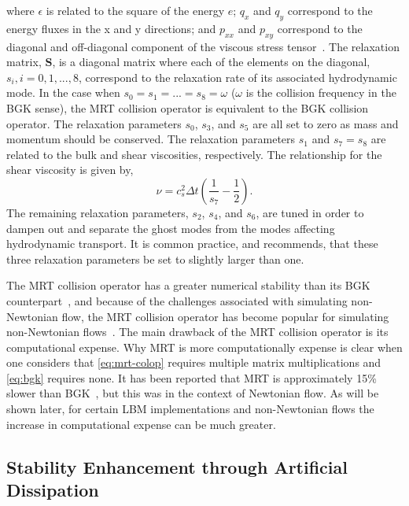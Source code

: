 \documentclass{article}
\newcommand{\relaxM}{\mathbf{S}}
\begin{document}
\noindent where $\epsilon$ is related to the square of the energy $e$; $q_x$ and $q_y$ correspond to the energy fluxes in the x and y directions; and $p_{xx}$ and $p_{xy}$ correspond to the diagonal and off-diagonal component of the viscous stress tensor~\cite{lallemand2000theory}. %
The relaxation matrix, $\relaxM$, is a diagonal matrix where each of the elements on the diagonal, $s_i, i = 0, 1, ..., 8$, correspond to the relaxation rate of its associated hydrodynamic mode.
In the case when $s_0 = s_1 = ... = s_8 = \omega$ ($\omega$ is the collision frequency in the BGK sense), the MRT collision operator is equivalent to the BGK collision operator.
The relaxation parameters $s_0$, $s_3$, and $s_5$ are all set to zero as mass and momentum should be conserved.
The relaxation parameters $s_1$ and $s_7 = s_8$ are related to the bulk and shear viscosities, respectively.
The relationship for the shear viscosity is given by,
\begin{equation} \label{eq:mrt-s7}
\nu = c_s^2 \Delta t (\frac{1}{s_7} - \frac{1}{2}).
\end{equation}
The remaining relaxation parameters, $s_2$, $s_4$, and $s_6$, are tuned in order to dampen out and separate the ghost modes from the modes affecting hydrodynamic transport.
It is common practice, and \citet{lallemand2000theory} recommends, that these three relaxation parameters be set to slightly larger than one.

The MRT collision operator has a greater numerical stability than its BGK counterpart~\cite{lallemand2000theory,dellar2003incompressible,d2002multiple}, and because of the challenges associated with simulating non-Newtonian flow, the MRT collision operator has become popular for simulating non-Newtonian flows~\cite{chen2014simulations,fallah2012multiple,tang2011bingham,vikhansky2008lattice,chai2011multiple,grasinger2015simulation}.
The main drawback of the MRT collision operator is its computational expense.
Why MRT is more computationally expense is clear when one considers that \eqref{eq:mrt-colop} requires multiple matrix multiplications and \eqref{eq:bgk} requires none.
It has been reported that MRT is approximately 15\% slower than BGK~\cite{d2002multiple}, but this was in the context of Newtonian flow.
As will be shown later, for certain LBM implementations and non-Newtonian flows the increase in computational expense can be much greater.

\subsection{Stability Enhancement through Artificial Dissipation}
\end{document}
